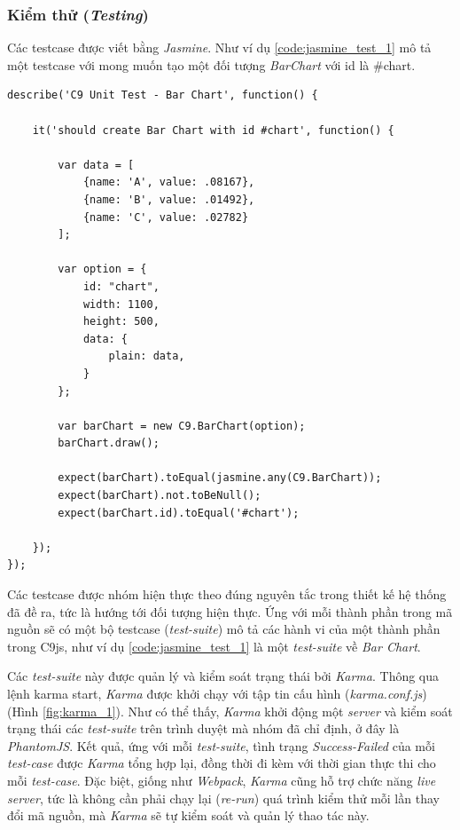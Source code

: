 \documentclass[12pt,a4paper,twoside]{article}
\begin{document}
\subsubsection{Kiểm thử (\textit{Testing})}

Các testcase được viết bằng \textit{Jasmine}. Như ví dụ \ref{code:jasmine_test_1} mô tả một testcase với mong muốn tạo một đối tượng \textit{BarChart} với id là \textsf{\#chart}.

\begin{lstlisting}[caption=Một testcase trong C9js được viết bằng Jasmine,label={code:jasmine_test_1}]
describe('C9 Unit Test - Bar Chart', function() {

    it('should create Bar Chart with id #chart', function() {

        var data = [
            {name: 'A', value: .08167},
            {name: 'B', value: .01492},
            {name: 'C', value: .02782}
        ];

        var option = {
            id: "chart", 
            width: 1100, 
            height: 500,
            data: {
                plain: data,
            }
        };

        var barChart = new C9.BarChart(option);
        barChart.draw();

        expect(barChart).toEqual(jasmine.any(C9.BarChart));
        expect(barChart).not.toBeNull();
        expect(barChart.id).toEqual('#chart');

    });
});
\end{lstlisting}

Các testcase được nhóm hiện thực theo đúng nguyên tắc trong thiết kế hệ thống đã đề ra, tức là hướng tới đối tượng hiện thực. Ứng với mỗi thành phần trong mã nguồn sẽ có một bộ testcase (\textit{test-suite}) mô tả các hành vi của một thành phần trong C9js, như ví dụ \ref{code:jasmine_test_1} là một \textit{test-suite} về \textit{Bar Chart}.

Các \textit{test-suite} này được quản lý và kiểm soát trạng thái bởi \textit{Karma}. Thông qua lệnh \textsf{karma start}, \textit{Karma} được khởi chạy với tập tin cấu hình (\textit{karma.conf.js}) (Hình \ref{fig:karma_1}). Như có thể thấy, \textit{Karma} khởi động một \textit{server} và kiểm soát trạng thái các \textit{test-suite} trên trình duyệt mà nhóm đã chỉ định, ở đây là \textit{PhantomJS}. Kết quả, ứng với mỗi \textit{test-suite}, tình trạng \textit{Success-Failed} của mỗi \textit{test-case} được \textit{Karma} tổng hợp lại, đồng thời đi kèm với thời gian thực thi cho mỗi \textit{test-case}. Đặc biệt, giống như \textit{Webpack}, \textit{Karma} cũng hỗ trợ chức năng \textit{live server}, tức là không cần phải chạy lại (\textit{re-run}) quá trình kiểm thử mỗi lần thay đổi mã nguồn, mà \textit{Karma} sẽ tự kiểm soát và quản lý thao tác này.
\end{document}

